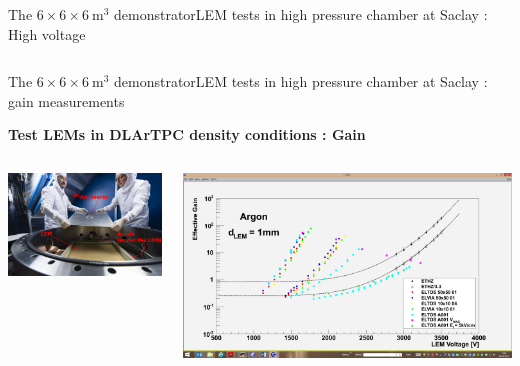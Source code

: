 \documentclass[10pt]{beamer}
\begin{document}
\begin{frame}{The \texorpdfstring{$6 \times 6 \times \SI{6}{\meter\cubed}$}{666} demonstrator}{LEM tests in high pressure chamber at Saclay : High voltage}
\begin{scriptsize}
\begin{columns}
\begin{column}{0.48\textwidth}
\begin{minipage}{0.48\textwidth}
	    			\end{minipage}
	    		\end{column}
	    	\end{columns}
    	\end{scriptsize} 
    \end{frame}
    
    \begin{frame}{The \texorpdfstring{$6 \times 6 \times \SI{6}{\meter\cubed}$}{666} demonstrator}{LEM tests in high pressure chamber at Saclay : gain measurements}
    	\begin{scriptsize}
    		\begin{center}\textbf{Test LEMs in DLArTPC density conditions : Gain}\end{center}
    		\begin{columns}
    			\begin{column}{0.38\textwidth}
    				\centering \includegraphics[width=\textwidth]{figures/666/gamelle_source.png}
    			\end{column}\hfill
    			\begin{column}{0.58\textwidth}
    				\centering \includegraphics[width=\textwidth]{figures/666/gain.png}

\end{column}
\end{columns}
\end{scriptsize}
\end{frame}
\end{document}
